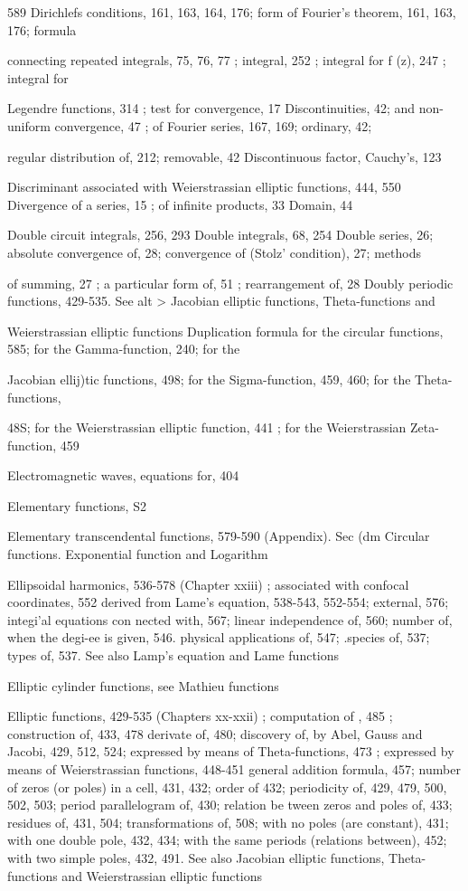 589
Dirichlefs conditions, 161, 163, 164, 176; form of Fourier's theorem, 161, 163, 176; formula

connecting repeated integrals, 75, 76, 77 ; integral, 252 ; integral for f (z), 247 ; integral for

Legendre functions, 314 ; test for convergence, 17
Discontinuities, 42; and non-uniform convergence, 47 ; of Fourier series, 167, 169; ordinary, 42;

regular distribution of, 212; removable, 42
Discontinuous factor, Cauchy's, 123

Discriminant associated with Weierstrassian elliptic functions, 444, 550
Divergence of a series, 15 ; of infinite products, 33
Domain, 44

Double circuit integrals, 256, 293
Double integrals, 68, 254
Double series, 26; absolute convergence of, 28; convergence of (Stolz' condition), 27; methods

of summing, 27 ; a particular form of, 51 ; rearrangement of, 28
Doubly periodic functions, 429-535. See alt > Jacobian elliptic functions, Theta-functions and

Weierstrassian elliptic functions
Duplication formula for the circular functions, 585; for the Gamma-function, 240; for the

Jacobian ellij)tic functions, 498; for the Sigma-function, 459, 460; for the Theta-functions,

48S; for the Weierstrassian elliptic function, 441 ; for the Weierstrassian Zeta-function, 459

Electromagnetic waves, equations for, 404

Elementary functions, S2

Elementary transcendental functions, 579-590 (Appendix). Sec (dm Circular functions.
Exponential function and Logarithm

Ellipsoidal harmonics, 536-578 (Chapter xxiii) ; associated with confocal coordinates, 552
derived from Lame's equation, 538-543, 552-554; external, 576; integi'al equations con
nected with, 567; linear independence of, 560; number of, when the degi-ee is given, 546.
physical applications of, 547; .species of, 537; types of, 537. See also Lamp's equation
and Lame functions

Elliptic cylinder functions, see Mathieu functions

Elliptic functions, 429-535 (Chapters xx-xxii) ; computation of , 485 ; construction of, 433, 478
derivate of, 480; discovery of, by Abel, Gauss and Jacobi, 429, 512, 524; expressed by
means of Theta-functions, 473 ; expressed by means of Weierstrassian functions, 448-451
general addition formula, 457; number of zeros (or poles) in a cell, 431, 432; order of
432; periodicity of, 429, 479, 500, 502, 503; period parallelogram of, 430; relation be
tween zeros and poles of, 433; residues of, 431, 504; transformations of, 508; with no
poles (are constant), 431; with one double pole, 432, 434; with the same periods (relations
between), 452; with two simple poles, 432, 491. See also Jacobian elliptic functions,
Theta-functions and Weierstrassian elliptic functions

